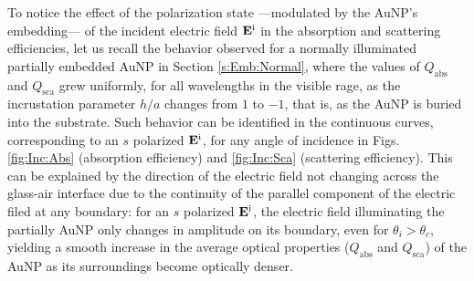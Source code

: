 To notice the effect of the  polarization state ---modulated by the AuNP's embedding--- of the incident electric field $\vb{E}^\text{i}$ in the absorption and scattering efficiencies, let us recall the behavior observed for a normally illuminated partially embedded AuNP in Section \ref{s:Emb:Normal}, where the values of $Q_\text{abs}$ and $Q_\text{sca}$ grew uniformly, for all wavelengths in the visible rage, as the incrustation parameter $h/a$ changes from $1$ to $-1$, that is, as the AuNP is buried into the substrate. Such behavior can be identified in the continuous curves, corresponding to an $s$ polarized $\vb{E}^\text{i}$, for any angle of incidence in Figs. \ref{fig:Inc:Abs} (absorption efficiency) and \ref{fig:Inc:Sca} (scattering efficiency). This can be explained by the direction of the electric field not changing across the glass-air interface due to the continuity of the parallel component of the electric filed at any boundary: for an $s$ polarized $\vb{E}^\text{i}$, the electric field illuminating the partially AuNP only changes in amplitude on its boundary, even for $\theta_i>\theta_c$, yielding a smooth increase in the average optical properties ($Q_\text{abs}$ and $Q_\text{sca}$) of the AuNP as its surroundings become optically denser.

